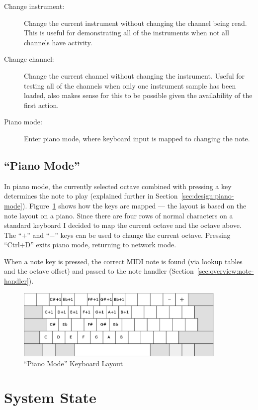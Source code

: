 \begin{description}
\item[Change instrument:] Change the current instrument without changing the channel being read.  
This is useful for demonstrating all of the instruments when not all channels have activity.
\item[Change channel:] Change the current channel without changing the instrument.  Useful for 
testing all of the channels when only one instrument sample has been loaded, also makes sense for 
this to be possible given the availability of the first action.
\item[Piano mode:] Enter piano mode, where keyboard input is mapped to changing the note.
\end{description}

\subsection{``Piano Mode''}

In piano mode, the currently selected octave combined with pressing a key determines the note to 
play (explained further in Section~\ref{sec:design:piano-mode}).  Figure~\ref{fig:piano-mode} shows 
how the keys are mapped --- the layout is based on the note layout on a piano.  Since there are four 
rows of normal characters on a standard keyboard I decided to map the current octave and the octave 
above.  The ``$+$'' and ``$-$'' keys can be used to change the current octave.  Pressing ``Ctrl+D'' 
exits piano mode, returning to network mode.

When a note key is pressed, the correct MIDI note is found (via lookup tables and the octave offset) 
and passed to the note handler (Section~\ref{sec:overview:note-handler}).

\begin{figure}[htb]
\centering
\includegraphics[width=0.9\textwidth]{images/piano-mode}
\caption{``Piano Mode'' Keyboard Layout}\label{fig:piano-mode}
\end{figure}

\section{System State}
\label{sec:overview:state}

